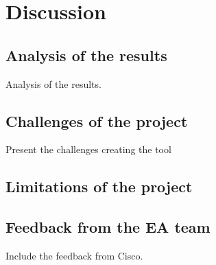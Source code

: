 
\chapter{Discussion} %

\label{Chapter6} %



\section{Analysis of the results}
Analysis of the results.

\section{Challenges of the project}
Present the challenges creating the tool

\section{Limitations of the project}

\section{Feedback from the EA team}
Include the feedback from Cisco.

